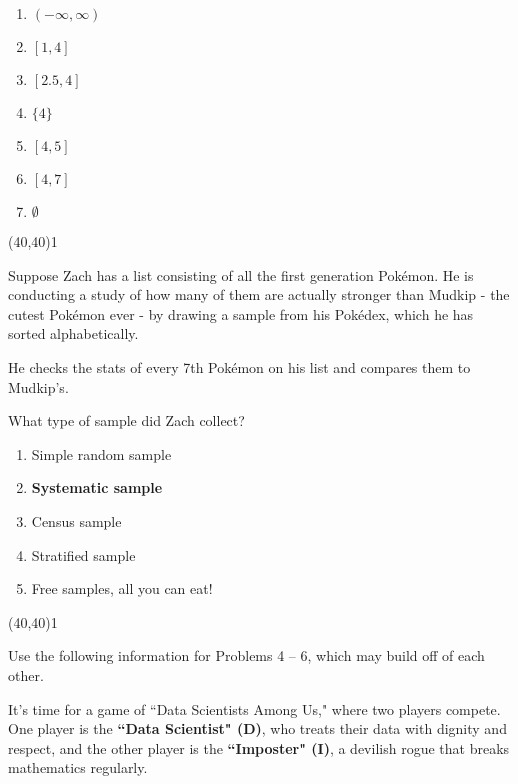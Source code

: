 \documentclass[addpoints]{exam}
\def\solutions{0}
\begin{document}
{\begin{questions}
\begin{minipage}[b]{.85\textwidth}
	\begin{enumerate}[label=\Alph*.]
		\item $(-\infty, \infty)$
		\item $[1,4]$
		\item $[2.5,4]$
		\item $\{4\}$
		\item $[4,5]$
		\item $[4,7]$
		\item $\emptyset$
	\end{enumerate}
\end{minipage}
\begin{minipage}[b]{.1\textwidth}
	\vspace{\fill}\framebox(40,40){\if\solutions1 \fi}
\end{minipage}
%
\question[3]  Suppose Zach has a list consisting of all the first generation Pok\'emon. He is conducting a study of how many of them are actually stronger than Mudkip - the cutest Pok\'emon ever - by drawing a sample from his Pok\'edex, which he has sorted alphabetically.

He checks the stats of every 7th Pok\'emon on his list and compares them to Mudkip's.

What type of sample did Zach collect?
\vspace{2mm}

\begin{minipage}[b]{.85\textwidth}
	\begin{enumerate}[label=\Alph*.]
		\item Simple random sample
		\item \textbf{Systematic sample}
		\item Census sample
		\item Stratified sample
		\item Free samples, all you can eat!
	\end{enumerate}
\end{minipage}
\begin{minipage}[b]{.1\textwidth}
	\vspace{\fill}\framebox(40,40){\if\solutions1 \fi}
\end{minipage}


\clearpage
\noindent Use the following information for Problems 4 -- 6, which may build off of each other.
\medskip

\noindent It's time for a game of ``Data Scientists Among Us," where two players compete. One player is the \textbf{``Data Scientist" (D)}, who treats their data with dignity and respect, and the other player is the \textbf{``Imposter" (I)}, a devilish rogue that breaks mathematics regularly.


\end{questions}}
\end{document}
